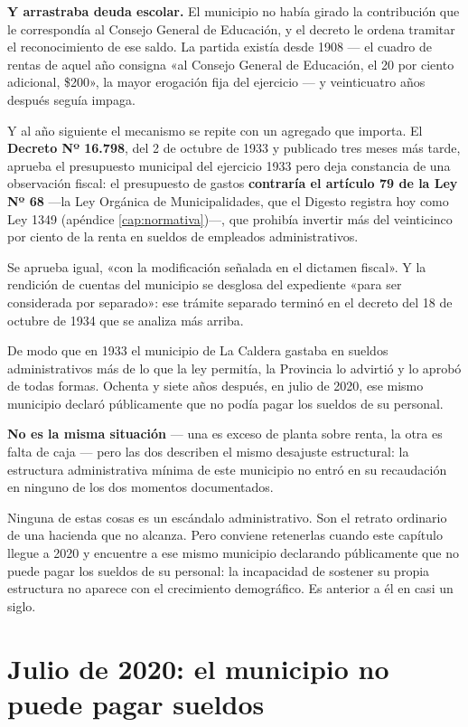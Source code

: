 \textbf{Y arrastraba deuda escolar.} El municipio no había girado la contribución que le
correspondía al Consejo General de Educación, y el decreto le ordena tramitar el
reconocimiento de ese saldo. La partida existía desde 1908 --- el cuadro de rentas de aquel
año consigna «al Consejo General de Educación, el 20 por ciento adicional, \$200», la mayor
erogación fija del ejercicio --- y veinticuatro años después seguía impaga.

Y al año siguiente el mecanismo se repite con un agregado que importa. El \textbf{Decreto
Nº 16.798}, del 2 de octubre de 1933 y publicado tres meses más tarde, aprueba el
presupuesto municipal del ejercicio 1933 pero deja constancia de una observación fiscal: el
presupuesto de gastos \textbf{contraría el artículo 79 de la Ley Nº 68} ---la Ley Orgánica de Municipalidades, que el Digesto registra hoy como Ley 1349 (apéndice \ref{cap:normativa})---, que prohibía invertir
más del veinticinco por ciento de la renta en sueldos de empleados administrativos.

Se aprueba igual, «con la modificación señalada en el dictamen fiscal». Y la rendición de
cuentas del municipio se desglosa del expediente «para ser considerada por separado»: ese
trámite separado terminó en el decreto del 18 de octubre de 1934 que se analiza más arriba.

De modo que en 1933 el municipio de La Caldera gastaba en sueldos administrativos más de lo
que la ley permitía, la Provincia lo advirtió y lo aprobó de todas formas. Ochenta y siete
años después, en julio de 2020, ese mismo municipio declaró públicamente que no podía pagar
los sueldos de su personal.

\textbf{No es la misma situación} --- una es exceso de planta sobre renta, la otra es falta
de caja --- pero las dos describen el mismo desajuste estructural: la estructura
administrativa mínima de este municipio no entró en su recaudación en ninguno de los dos momentos documentados.

Ninguna de estas cosas es un escándalo administrativo. Son el retrato ordinario de una
hacienda que no alcanza. Pero conviene retenerlas cuando este capítulo llegue a 2020 y
encuentre a ese mismo municipio declarando públicamente que no puede pagar los sueldos de su
personal: la incapacidad de sostener su propia estructura no aparece con el crecimiento
demográfico. Es anterior a él en casi un siglo.


\section{Julio de 2020: el municipio no puede pagar sueldos}


